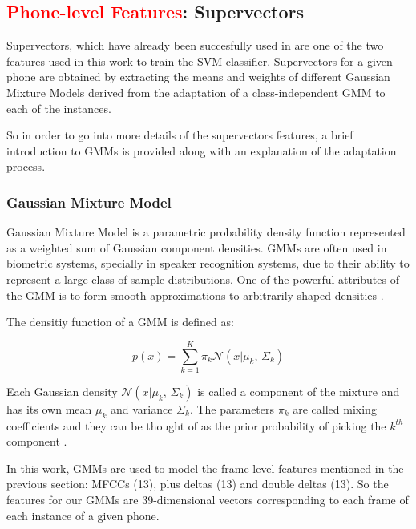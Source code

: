 \subsection{\textcolor{red}{Phone-level Features}: Supervectors}

Supervectors, which have already been succesfully used in
\cite{supervectors, main} are one of the two features used in this work to train the SVM
classifier. Supervectors for a given phone are obtained by extracting the means and weights
of different
Gaussian Mixture Models derived from the adaptation of a class-independent GMM
to each of the instances.

So in order to go into more details of the supervectors features, a brief introduction to
GMMs is provided along with an explanation of the adaptation process.

\subsubsection{Gaussian Mixture Model}

Gaussian Mixture Model is a parametric probability density function represented as a weighted
sum of Gaussian component densities. GMMs are often used in biometric systems, specially
in speaker recognition systems, due to their ability to represent a large class of sample
distributions. One of the powerful attributes of the GMM is to form smooth approximations to
arbitrarily shaped densities \cite{gmm_reynolds}.

The densitiy function of a GMM is defined as:

\begin{equation}
  p(x) = \sum_{k=1}^{K}\pi_{k} \mathcal{N}(x|\mu_{k},\,\Sigma_{k})
\end{equation}

Each Gaussian density $\mathcal{N}(x|\mu_{k},\,\Sigma_{k})$ is called a component of the mixture
and has its own mean $\mu_{k}$ and variance $\Sigma_{k}$. The parameters $\pi_{k}$ are called
mixing coefficients and they can be thought of as the prior probability of picking the $k^{th}$
component \cite{gmm_bishop}.

In this work, GMMs are used to model the frame-level features mentioned in the previous section:
MFCCs (13), plus deltas (13) and double deltas (13). So the features for our GMMs are
39-dimensional vectors corresponding to each frame of each instance of a given phone.


